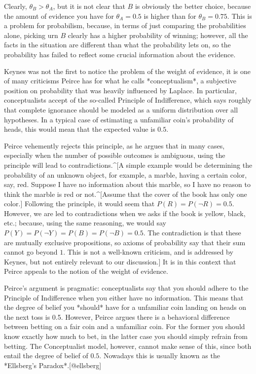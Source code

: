 Clearly, \(\theta_B > \theta_A\), but it is not clear that \(B\) is
obviously the better choice, because the amount of evidence you have for
\(\theta_A = 0.5\) is higher than for \(\theta_B = 0.75\). This is a
problem for probabilism, because, in terms of just comparing the
probabilities alone, picking urn \(B\) clearly has a higher probability
of winning; however, all the facts in the situation are different than
what the probability lets on, so the probability has failed to reflect
some crucial information about the evidence.

Keynes was not the first to notice the problem of the weight of
evidence, it is one of many criticisms Peirce has for what he calls
*conceptualism*, a subjective position on probability that was heavily
influenced by Laplace. In particular, conceptualists accept of the
so-called Principle of Indifference, which says roughly that complete
ignorance should be modeled as a uniform distribution over all
hypotheses. In a typical case of estimating a unfamiliar coin's
probability of heads, this would mean that the expected value is
\(0.5\).

Peirce vehemently rejects this principle, as he argues that in many
cases, especially when the number of possible outcomes is ambiguous,
using the principle will lead to contradictions.\^{}{[}A simple example
would be determining the probability of an unknown object, for example,
a marble, having a certain color, say, red. Suppose I have no
information about this marble, so I have no reason to think the marble
is red or not.\^{}{[}Assume that the cover of the book has only one
color.{]} Following the principle, it would seem that
\(P(R) = P(\neg R) = 0.5\). However, we are led to contradictions when
we asks if the book is yellow, black, etc.; because, using the same
reasoning, we would say \(P(Y) = P(\neg Y) = P(B) = P(\neg B) = 0.5\).
The contradiction is that these are mutually exclusive propositions, so
axioms of probability say that their sum cannot go beyond \(1\). This is
not a well-known criticism, and is addressed by Keynes, but not entirely
relevant to our discussion.{]} It is in this context that Peirce appeals
to the notion of the weight of evidence.

Peirce's argument is pragmatic: conceptualists say that you should
adhere to the Principle of Indifference when you either have no
information. This means that the degree of belief you *should* have for
a unfamiliar coin landing on heads on the next toss is 0.5. However,
Peirce argues there is a behavioral difference between betting on a fair
coin and a unfamiliar coin. For the former you should know exactly how
much to bet, in the latter case you should simply refrain from betting.
The Conceptualist model, however, cannot make sense of this, since both
entail the degree of belief of \(0.5\). Nowadays this is usually known
as the *Ellsberg's Paradox*.{[}@ellsberg{]}

